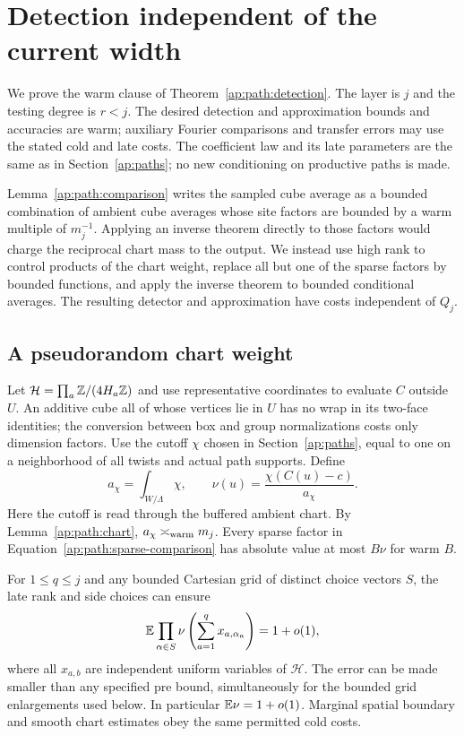 \section{Detection independent of the current width}
\label{ap:relative-detection}

We prove the warm clause of Theorem~\ref{ap:path:detection}.
The layer is $j$ and the testing degree is $r<j$. The desired
detection and approximation bounds and accuracies are warm;
auxiliary Fourier comparisons and transfer errors may use the
stated cold and late costs. The coefficient law and its late
parameters are the same as in Section~\ref{ap:paths}; no new
conditioning on productive paths is made.

Lemma~\ref{ap:path:comparison} writes the sampled cube average as
a bounded combination of ambient cube averages whose site
factors are bounded by a warm multiple of $m_j^{-1}$. Applying an inverse
theorem directly to those factors would charge the reciprocal
chart mass to the output. We instead use high rank to control
products of the chart weight, replace all but one of the sparse
factors by bounded functions, and apply the inverse theorem to
bounded conditional averages. The resulting detector and
approximation have costs independent of $Q_j$.

\subsection{A pseudorandom chart weight}

Let $\mathcal H=\prod_a\mathbb Z/(4H_a\mathbb Z)$ and use representative
coordinates to evaluate $C$ outside $U$.  An additive cube all of
whose vertices lie in $U$ has no wrap in its two-face identities;
the conversion between box and group normalizations costs only
dimension factors.  Use the cutoff $\chi$ chosen in
Section~\ref{ap:paths}, equal to one on a neighborhood of all
twists and actual path supports. Define
\begin{equation}\label{ap:path:weight}
 a_\chi=\int_{W/\Lambda}\chi,\qquad
 \nu(u)=\frac{\chi(C(u)-c)}{a_\chi}.
\end{equation}
Here the cutoff is read through the buffered ambient chart.  By
Lemma~\ref{ap:path:chart}, $a_\chi\asymp_{\rm warm}m_j$.
Every sparse factor in Equation~\eqref{ap:path:sparse-comparison}
has absolute value at most $B\nu$ for warm $B$.

\begin{lemma}\label{ap:path:grid}
For $1\le q\le j$ and any bounded Cartesian grid of distinct choice
vectors $S$, the late rank and side choices can ensure
\begin{equation}\label{ap:path:grid-moment}
 \mathbb E\prod_{\alpha\in S}
 \nu\left(\sum_{a=1}^q x_{a,\alpha_a}\right)=1+o(1),
\end{equation}
where all $x_{a,b}$ are independent uniform variables of
$\mathcal H$.  The error can be made smaller than any specified
pre bound, simultaneously for the bounded grid enlargements used
below.  In particular $\mathbb E\nu=1+o(1)$.  Marginal spatial boundary
and smooth chart estimates obey the same permitted cold costs.
\end{lemma}

